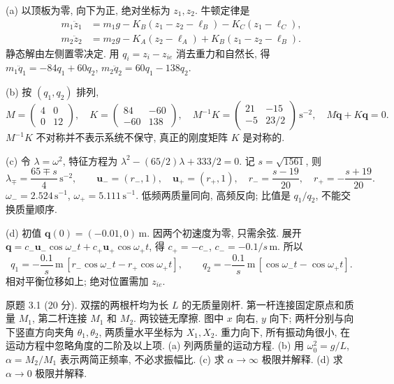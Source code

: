 \begin{solution}
(a) 以顶板为零, 向下为正, 绝对坐标为 $z_1,z_2$. 牛顿定律是
\begin{align*}
m_1\ddot z_1&=m_1g-K_B(z_1-z_2-\ell_B)-K_C(z_1-\ell_C),\\
m_2\ddot z_2&=m_2g-K_A(z_2-\ell_A)+K_B(z_1-z_2-\ell_B).
\end{align*}
静态解由左侧置零决定. 用 $q_i=z_i-z_{ie}$ 消去重力和自然长, 得 $m_1\ddot q_1=-84q_1+60q_2$, $m_2\ddot q_2=60q_1-138q_2$.

(b) 按 $(q_1,q_2)$ 排列,
\[
M=\begin{pmatrix}4&0\\0&12\end{pmatrix},\quad K=\begin{pmatrix}84&-60\\-60&138\end{pmatrix},\quad
M^{-1}K=\begin{pmatrix}21&-15\\-5&23/2\end{pmatrix}\,\mathrm{s}^{-2},\quad M\ddot{\boldsymbol q}+K\boldsymbol q=0.
\]
$M^{-1}K$ 不对称并不表示系统不保守, 真正的刚度矩阵 $K$ 是对称的.

(c) 令 $\lambda=\omega^2$, 特征方程为 $\lambda^2-(65/2)\lambda+333/2=0$. 记 $s=\sqrt{1561}$, 则
\[
\lambda_\mp=\frac{65\mp s}{4}\,\mathrm{s}^{-2},\qquad
\boldsymbol u_-=(r_-,1),\quad \boldsymbol u_+=(r_+,1),\quad
r_-=\frac{s-19}{20},\quad r_+=-\frac{s+19}{20}.
\]
$\omega_-=2.524\,\mathrm{s}^{-1}$, $\omega_+=5.111\,\mathrm{s}^{-1}$. 低频两质量同向, 高频反向; 比值是 $q_1/q_2$, 不能交换质量顺序.

(d) 初值 $\boldsymbol q(0)=(-0.01,0)\,\mathrm m$. 因两个初速度为零, 只需余弦. 展开 $\boldsymbol q=c_-\boldsymbol u_-\cos\omega_-t+c_+\boldsymbol u_+\cos\omega_+t$, 得 $c_+=-c_-$, $c_-=-0.1/s\,\mathrm m$. 所以
\[
q_1=-\frac{0.1}{s}\,\mathrm m\,[r_-\cos\omega_-t-r_+\cos\omega_+t],\qquad
q_2=-\frac{0.1}{s}\,\mathrm m\,[\cos\omega_-t-\cos\omega_+t].
\]
相对平衡位移如上; 绝对位置需加 $z_{ie}$.
\end{solution}
\begin{exercise}\label{ps:3.1}
原题 3.1 (20 分). 双摆的两根杆均为长 $L$ 的无质量刚杆. 第一杆连接固定原点和质量 $M_1$, 第二杆连接 $M_1$ 和 $M_2$. 两铰链无摩擦. 图中 $x$ 向右, $y$ 向下; 两杆分别与向下竖直方向夹角 $\theta_1,\theta_2$, 两质量水平坐标为 $X_1,X_2$. 重力向下, 所有振动角很小, 在运动方程中忽略角度的二阶及以上项. (a) 列两质量的运动方程. (b) 用 $\omega_0^2=g/L$, $\alpha=M_2/M_1$ 表示两简正频率, 不必求振幅比. (c) 求 $\alpha\to\infty$ 极限并解释. (d) 求 $\alpha\to0$ 极限并解释.
\end{exercise}
